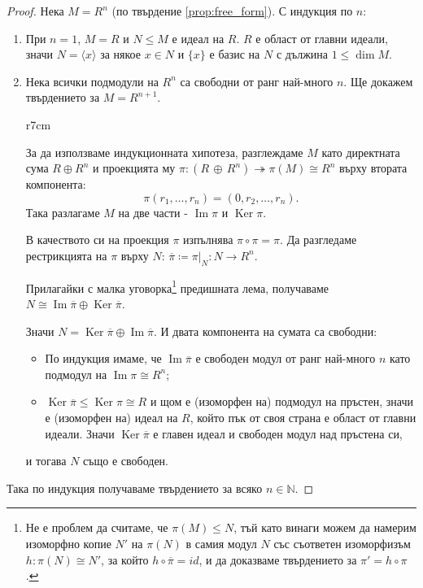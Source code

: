 \documentclass{article}
\newif\ifusemulticols
\newif\ifmobileview
\theoremstyle{definition}
\theoremstyle{remark}
\theoremstyle{plain}
\theoremstyle{plain}
\newenvironment{mymulticols}
    { \ifusemulticols \begin{multicols}{2} \fi }
    { \ifusemulticols \end{multicols} \fi }
\newcommand\mywrapbegin[3]{\ifmobileview\else\begin{wrapfigure}[#1]{#2}{#3}\fi}
\newcommand\mywrapend{\ifmobileview\else\end{wrapfigure}\fi}
\DeclareMathOperator{\Ker}{Ker}
\DeclareMathOperator{\image}{Im}
\newcommand{\N}{\mathbb{N}}
\begin{document}
\begin{mymulticols}
\begin{proof}
    Нека $M = R^n$ (по твърдение \ref{prop:free_form}). С индукция по $n$:
    \begin{enumerate}
        \item При $n=1$, $M = R$ и $N \le M$ е идеал на $R$. $R$ е област от главни идеали, значи $N
            = \langle x \rangle$ за някое $x \in N$ и $\{x\}$ е базис на $N$ с дължина $1 \le \dim
            M$.
        \item
            Нека всички подмодули на $R^n$ са свободни от ранг най-много $n$.
            Ще докажем твърдението за $M = R^{n+1}$.

            \begin{minipage}{\linewidth}
                \mywrapbegin{11}{r}{7cm}
                \mywrapend

                За да използваме индукционната хипотеза, разглеждаме $M$ като директната сума $R\oplus
                R^n$ и проекцията му $\pi : (R \, \oplus \, R^n) \twoheadrightarrow \pi(M) \cong R^n$
                върху втората компонента: $$\pi(r_1,\ldots,r_n)=\left(0, r_2,\ldots,r_n \right).$$
                Така разлагаме $M$ на две части - $\image \pi$ и $\Ker \pi$.

                В качеството си на проекция $\pi$ изпълнява $\pi \circ \pi = \pi$.  Да разгледаме
                рестрикцията на $\pi$ върху $N$: $\overline \pi \coloneqq \pi|_N : {N \to R^n}$.
            \end{minipage}

            Прилагайки с малка уговорка\footnote{Не е проблем да считаме, че $\pi(M) \le N$, тъй
            като винаги можем да намерим изоморфно копие $N'$ на $\pi(N)$ в самия модул $N$ със
            съответен изоморфизъм $h : \pi(N) \cong N'$, за който $h \circ \overline\pi = id$, и да
            доказваме твърдението за $\pi' = h\circ\pi$.} предишната лема, получаваме $N \cong
            \image \overline\pi \oplus \Ker \overline\pi$.

            Значи $N = \Ker \overline\pi \oplus \image \overline\pi$. И двата компонента на сумата са свободни:
            \begin{itemize}
                \item По индукция имаме, че $\image \overline\pi$ е свободен модул от ранг най-много
                    $n$ като подмодул на $\image \pi \cong R^n$;
                \item $\Ker \overline\pi\le \Ker \pi \cong R$ и щом е (изоморфен на) подмодул на
                    пръстен, значи е (изоморфен на) идеал на $R$, който пък от своя страна е област
                    от главни идеали.
                    Значи $\Ker \overline \pi$ е главен идеал и свободен модул над пръстена си,
            \end{itemize}
            и тогава $N$ също е свободен.
    \end{enumerate}
    Така по индукция получаваме твърдението за всяко $n \in \N$.
\end{proof}


\end{mymulticols}
\end{document}
